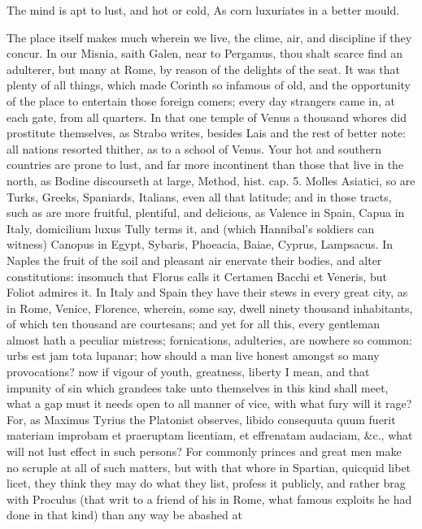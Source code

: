 {The mind is apt to lust, and hot or cold,
As corn luxuriates in a better mould.

The place itself makes much wherein we live, the clime, air, and
discipline if they concur. In our Misnia, saith Galen, near to
Pergamus, thou shalt scarce find an adulterer, but many at Rome, by
reason of the delights of the seat. It was that plenty of all things,
which made Corinth so infamous of old, and the opportunity of the
place to entertain those foreign comers; every day strangers came in,
at each gate, from all quarters. In that one temple of Venus a thousand
whores did prostitute themselves, as Strabo writes, besides Lais and
the rest of better note: all nations resorted thither, as to a school
of Venus. Your hot and southern countries are prone to lust, and far
more incontinent than those that live in the north, as Bodine
discourseth at large, Method, hist. cap. 5. Molles Asiatici, so are
Turks, Greeks, Spaniards, Italians, even all that latitude; and in
those tracts, such as are more fruitful, plentiful, and delicious, as
Valence in Spain, Capua in Italy, domicilium luxus Tully terms it, and
(which Hannibal's soldiers can witness) Canopus in Egypt, Sybaris,
Phoeacia, Baiae, Cyprus, Lampsacus. In Naples the fruit of
the soil and pleasant air enervate their bodies, and alter
constitutions: insomuch that Florus calls it Certamen Bacchi et
Veneris, but Foliot admires it. In Italy and Spain they have
their stews in every great city, as in Rome, Venice, Florence, wherein,
some say, dwell ninety thousand inhabitants, of which ten thousand are
courtesans; and yet for all this, every gentleman almost hath a
peculiar mistress; fornications, adulteries, are nowhere so common:
urbs est jam tota lupanar; how should a man live honest amongst so many
provocations? now if vigour of youth, greatness, liberty I mean, and
that impunity of sin which grandees take unto themselves in this kind
shall meet, what a gap must it needs open to all manner of vice, with
what fury will it rage? For, as Maximus Tyrius the Platonist observes,
libido consequuta quum fuerit materiam improbam et praeruptam
licentiam, et effrenatam audaciam, \&c., what will not lust effect in
such persons? For commonly princes and great men make no scruple at all
of such matters, but with that whore in Spartian, quicquid libet licet,
they think they may do what they list, profess it publicly, and rather
brag with Proculus (that writ to a friend of his in Rome, what
famous exploits he had done in that kind) than any way be abashed at
}
